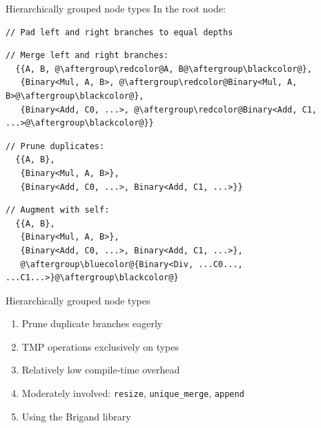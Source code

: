 \documentclass[xcolor=dvipsnames]{beamer}
\begin{document}
\begin{frame}[fragile]{Hierarchically grouped node types}
In the {\color{blue}root} node:
\begin{lstlisting}
// Pad left and right branches to equal depths
\end{lstlisting}
\begin{lstlisting}
// Merge left and right branches:
  {{A, B, @\aftergroup\redcolor@A, B@\aftergroup\blackcolor@},
   {Binary<Mul, A, B>, @\aftergroup\redcolor@Binary<Mul, A, B>@\aftergroup\blackcolor@},
   {Binary<Add, C0, ...>, @\aftergroup\redcolor@Binary<Add, C1, ...>@\aftergroup\blackcolor@}}
\end{lstlisting}
\begin{lstlisting}
// Prune duplicates:
  {{A, B},
   {Binary<Mul, A, B>},
   {Binary<Add, C0, ...>, Binary<Add, C1, ...>}}
\end{lstlisting}
\begin{lstlisting}
// Augment with self:
  {{A, B},
   {Binary<Mul, A, B>},
   {Binary<Add, C0, ...>, Binary<Add, C1, ...>},
   @\aftergroup\bluecolor@{Binary<Div, ...C0..., ...C1...>}@\aftergroup\blackcolor@}
\end{lstlisting}
\end{frame}


\begin{frame}[fragile]{Hierarchically grouped node types}
  \begin{enumerate}
  \item Prune duplicate branches eagerly \vspace{5mm}
  \item TMP operations exclusively on types \vspace{5mm}
  \item Relatively low compile-time overhead \vspace{5mm}
  \item Moderately involved: \texttt{resize}, \texttt{unique\_merge}, \texttt{append} \vspace{5mm}
  \item Using the Brigand library \vspace{5mm}
  \end{enumerate}
\end{frame}
\end{document}
